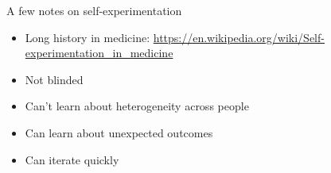 \documentclass[aspectratio=169]{beamer}
\begin{document}
\begin{frame}

A few notes on self-experimentation
\begin{itemize}
\item Long history in medicine: {\tiny \url{https://en.wikipedia.org/wiki/Self-experimentation_in_medicine}} \pause
\item Not blinded \pause
\item Can't learn about heterogeneity across people \pause
\item Can learn about unexpected outcomes \pause
\item Can iterate quickly
\end{itemize}

\end{frame}
\end{document}
